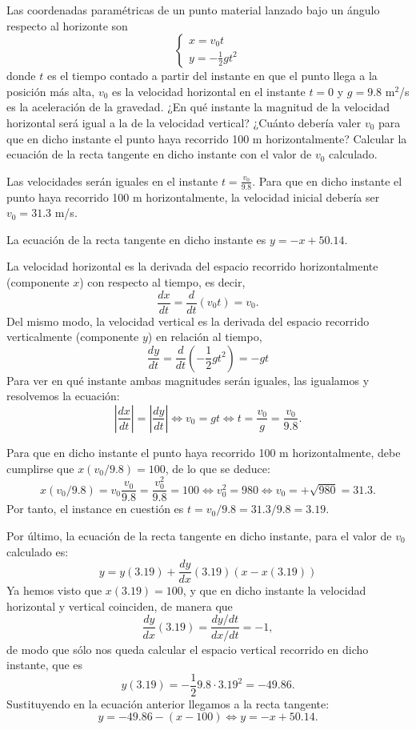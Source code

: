 {Las coordenadas paramétricas de un punto material lanzado bajo un ángulo respecto al horizonte son
\[
\left\{
  \begin{array}{ll}
    x=v_0t \\
    y=-\frac{1}{2}gt^2
  \end{array}
\right.
\]
donde $t$ es el tiempo contado a partir del instante en que el punto llega a la posición más alta, $v_0$ es la velocidad horizontal en el instante $t=0$ y $g=9.8$ m$^2$/s es la aceleración de la gravedad. ¿En qué instante la magnitud de la velocidad horizontal será igual a la de la velocidad vertical? ¿Cuánto debería valer $v_0$ para que en dicho instante el punto haya recorrido 100 m horizontalmente? Calcular la ecuación de la recta tangente en dicho instante con el valor de $v_0$ calculado.
}
{
Las velocidades serán iguales en el instante $ t=\frac{v_0}{9.8}$. Para que en dicho instante el punto haya recorrido 100 m horizontalmente,
la velocidad inicial debería ser $v_0 = 31.3$ m/s.

La ecuación de la recta tangente en dicho instante es $y =-x+50.14$.
}
{La velocidad horizontal es la derivada del espacio recorrido horizontalmente (componente $x$) con respecto al tiempo, es decir,
\[
\frac{dx}{dt} = \frac{d}{dt}(v_0t)=v_0.
\]
Del mismo modo, la velocidad vertical es la derivada del espacio recorrido verticalmente (componente $y$) en relación al tiempo,
\[
\frac{dy}{dt} = \frac{d}{dt}(-\frac{1}{2}gt^2)=-gt
\]
Para ver en qué instante ambas magnitudes serán iguales, las igualamos y resolvemos la ecuación:
\[
|\frac{dx}{dt}|=|\frac{dy}{dt}| \Leftrightarrow v_0 = gt \Leftrightarrow t=\frac{v_0}{g}=\frac{v_0}{9.8}.
\]

Para que en dicho instante el punto haya recorrido 100 m horizontalmente, debe cumplirse que $x(v_0/9.8)=100$, de lo que se deduce:
\[
x(v_0/9.8)=v_0\frac{v_0}{9.8} = \frac{v_0^2}{9.8}=100 \Leftrightarrow v_0^2 = 980 \Leftrightarrow v_0 = +\sqrt{980}= 31.3.
\]
Por tanto, el instance en cuestión es $t=v_0/9.8= 31.3/9.8 = 3.19$.

Por último, la ecuación de la recta tangente en dicho instante, para el valor de $v_0$ calculado es:
\[
y = y(3.19) + \frac{dy}{dx}(3.19) (x-x(3.19))
\]
Ya hemos visto que $x(3.19)=100$, y que en dicho instante la velocidad horizontal y vertical coinciden, de manera que
\[
\frac{dy}{dx}(3.19)=\frac{dy/dt}{dx/dt}=-1,
\]
de modo que sólo nos queda calcular el espacio vertical recorrido en dicho instante, que es
\[
y(3.19)=-\frac{1}{2}9.8\cdot 3.19^2= -49.86.
\]
Sustituyendo en la ecuación anterior llegamos a la recta tangente:
\[
y = -49.86-(x-100) \Leftrightarrow y=-x+50.14.
\]
}


